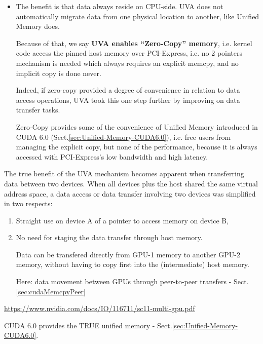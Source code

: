 \begin{itemize}

  \item The benefit is that data always reside on CPU-side. UVA does not
  automatically migrate data from one physical location to another, like Unified
  Memory does.

  Because of that, we say {\bf UVA enables “Zero-Copy” memory}, i.e. kernel code
  access the pinned host memory over PCI-Express, i.e. no 2 pointers mechanism
  is needed which always requires an explicit memcpy, and no implicit copy is
  done never.
  
Indeed, if zero-copy provided a degree of convenience in relation to data access
operations, UVA took this one step further by improving on data transfer tasks.

Zero-Copy provides some of the convenience of Unified Memory introduced in CUDA
6.0 (Sect.\ref{sec:Unified-Memory-CUDA6.0}), i.e. free users from managing the
explicit copy, but none of the performance, because it is always accessed with
PCI-Express’s low bandwidth and high latency.
  
\end{itemize}

The true benefit of the UVA mechanism becomes apparent when transferring data
between two devices. When all devices plus the host shared the same virtual
address space, a data access or data transfer involving two devices was
simplified in two respects:
\begin{enumerate}
  \item  Straight use on device A of a pointer to access memory on device B,

  \item  No need for staging the data transfer through host memory.
  
  Data can be transfered directly from GPU-1 memory to another GPU-2 memory,
  without having to copy first into the (intermediate) host memory.
  
  Here: data movement between GPUs through peer-to-peer transfers -
  Sect.\ref{sec:cudaMemcpyPeer}
  
\end{enumerate}
\url{https://www.nvidia.com/docs/IO/116711/sc11-multi-gpu.pdf}

CUDA 6.0 provides the TRUE unified memory - Sect.\ref{sec:Unified-Memory-CUDA6.0}.

